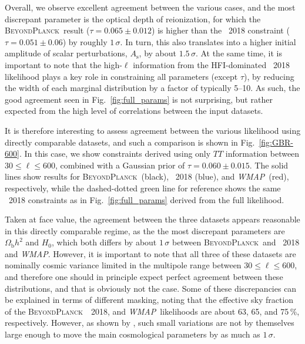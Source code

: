 \documentclass[twocolumn]{aa}
\def\WMAP{\textit{WMAP}}
\newcommand{\BP}{\textsc{BeyondPlanck}}
\begin{document}
Overall, we observe excellent agreement between the various cases, and
the most discrepant parameter is the optical depth of reionization,
for which the \BP\ result ($\tau=0.065\pm0.012$) is higher than the
\Planck\ 2018 constraint ($\tau=0.051\pm0.06$) by roughly
$1\,\sigma$. In turn, this also translates into a higher initial
amplitude of scalar perturbations, $A_{\mathrm{s}}$, by about
$1.5\,\sigma$. At the same time, it is important to note that the
high-$\ell$ information from the HFI-dominated \Planck\ 2018
likelihood plays a key role in constraining all parameters (except
$\tau$), by reducing the width of each marginal distribution by a
factor of typically 5--10. As such, the good agreement seen in
Fig.~\ref{fig:full_params} is not surprising, but rather expected from
the high level of correlations between the input datasets.

It is therefore interesting to assess agreement between the various
likelihood using directly comparable datasets, and such a comparison
is shown in Fig.~\ref{fig:GBR-600}. In this case, we show constraints
derived using only $TT$ information between $30\le\ell\le600$,
combined with a Gaussian prior of $\tau=0.060\pm0.015$. The solid
lines show results for \BP\ (black), \Planck\ 2018 (blue), and
\WMAP\ (red), respectively, while the dashed-dotted green line for
reference shows the same \Planck\ 2018 constraints as in
Fig.~\ref{fig:full_params} derived from the full likelihood.

Taken at face value, the agreement between the three datasets appears
reasonable in this directly comparable regime, as the the most
discrepant parameters are $\Omega_{\mathrm{b}}h^2$ and $H_0$, which
both differs by about $1\,\sigma$ between \BP\ and \Planck\ 2018 and
\WMAP. However, it is important to note that all three of these datasets
are nominally cosmic variance limited in the multipole range between
$30\le\ell\le 600$, and therefore one should in principle expect
perfect agreement between these distributions, and that is obviously
not the case. Some of these discrepancies can be explained in terms of
different masking, noting that the effective sky fraction of the \BP\,
\Planck\ 2018, and \WMAP\ likelihoods are about 63, 65, and 75\,\%,
respectively. However, as shown by \citet{planck2016-l05}, such small
variations are not by themselves large enough to move the main
cosmological parameters by as much as $1\,\sigma$.
\end{document}
